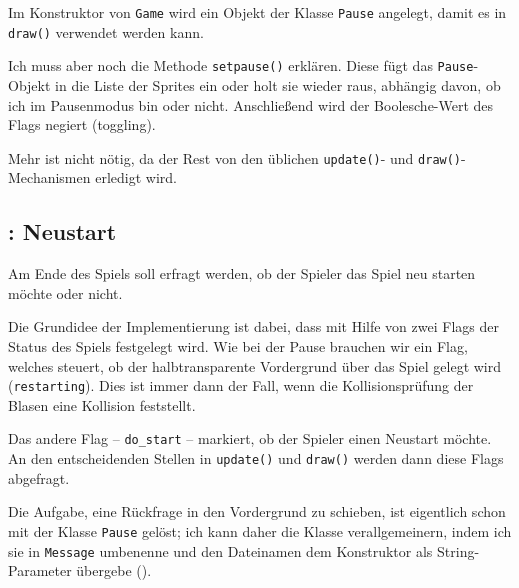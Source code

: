 \newpage
{}  

Im Konstruktor von \texttt{Game} wird ein Objekt der Klasse \texttt{Pause} angelegt, damit es in \texttt{draw()} verwendet werden kann. 


Ich muss aber noch die Methode \texttt{setpause()} erklären. Diese fügt das \texttt{Pause}-Objekt in die Liste der Sprites ein oder holt sie wieder raus, abhängig davon, ob ich im Pausenmodus bin oder nicht. Anschließend wird der Boolesche-Wert des Flags negiert (\gls{toggling}).


Mehr ist nicht nötig, da der Rest von den üblichen \texttt{update()}- und \texttt{draw()}-Mechanismen erledigt wird.

\subsection{: Neustart}
 Am Ende des Spiels soll erfragt werden, ob der Spieler das Spiel neu starten möchte oder nicht.
\er

Die Grundidee der Implementierung ist dabei, dass mit Hilfe von zwei Flags der Status des Spiels festgelegt wird. Wie bei der Pause brauchen wir ein Flag, welches steuert, ob der halbtransparente Vordergrund über das Spiel gelegt wird (\texttt{restarting}). Dies ist immer dann der Fall, wenn die Kollisionsprüfung der Blasen eine Kollision feststellt. 

Das andere Flag -- \texttt{do\_start} -- markiert, ob der Spieler einen Neustart möchte. An den entscheidenden Stellen in \texttt{update()} und \texttt{draw()} werden dann diese Flags abgefragt.

Die Aufgabe, eine Rückfrage in den Vordergrund zu schieben, ist eigentlich schon mit der Klasse \texttt{Pause} gelöst; ich kann daher die Klasse verallgemeinern, indem ich sie in \texttt{Message} umbenenne und den Dateinamen dem Konstruktor als String-Parameter übergebe ().

